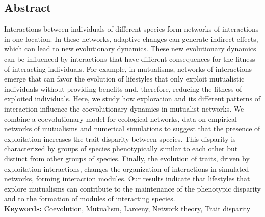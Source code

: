 \documentclass[a4paper, 12pt]{article}
\begin{document}
\subsection*{Abstract}
Interactions between individuals of different species form networks of interactions in one location. In these networks, adaptive changes can generate indirect effects, which can lead to new evolutionary dynamics. These new evolutionary dynamics can be influenced by interactions that have different consequences for the fitness of interacting individuals. For example, in mutualisms, networks of interactions emerge that can favor the evolution of lifestyles that only exploit mutualistic individuals without providing benefits and, therefore, reducing the fitness of exploited individuals. Here, we study how exploration and its different patterns of interaction influence the coevolutionary dynamics in mutualist networks. We combine a coevolutionary model for ecological networks, data on empirical networks of mutualisms and numerical simulations to suggest that the presence of exploitation increases the trait disparity between species. This disparity is characterized by groups of species phenotypically similar to each other but distinct from other groups of species. Finally, the evolution of traits, driven by exploitation interactions, changes the organization of interactions in simulated networks, forming interaction modules. Our results indicate that lifestyles that explore mutualisms can contribute to the maintenance of the phenotypic disparity and to the formation of modules of interacting species.\\
\textbf{Keywords:} Coevolution, Mutualism, Larceny, Network theory, Trait disparity

\newpage

\end{document}

